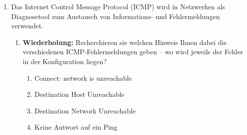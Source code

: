 \documentclass[paper=a4,fontsize=11pt]{scrartcl}%
\numberwithin{equation}{section}
\begin{document}
\begin{enumerate}
	\begin{enumerate}
	\item Recherchieren sie mit den vorangegangen Quellen, was ein Routing-Table/Routing-Tabelle ist \footnote{\url{https://docs.freebsd.org/doc/12.1-RELEASE/usr/local/share/doc/freebsd/de_DE.ISO8859-1/books/handbook/network-routing.html}}.
	\item Recherchieren sie den Unterschied zwischen Forwarding und Routing.
	\item Wie aktivieren sie unter \emph{freeBSD} das Forwarding? Analog: Wie wird  das Forwarding unter Linux (Arch-Linux) eingeschaltet?
	\item In welcher Konfigurationsdatei müssen sie einen Eintrag vornehmen, so das das Routing dauerhaft beim Systemstart aktiviert bleibt? Notieren sie sich beispielhaft (auszugsweise) wie dies aussehen kann.
	\end{enumerate}
	\item Das Internet Control Message Protocol (ICMP) wird in Netzwerken als Diagnosetool zum Austausch von Informations- und Fehlermeldungen verwendet. 
	\begin{enumerate}
		\item \textbf{Wiederholung:} Recherchieren sie welchen Hinweis Ihnen dabei die verschiedenen ICMP-Fehlermeldungen geben -- wo wird jeweils der Fehler in der Konfiguration liegen?
		\begin{enumerate}
			\item Connect: network is unreachable
			\item Destination Host Unreachable
			\item Destination Network Unreachable
			\item Keine Antwort auf ein Ping
		\end{enumerate}  
	\end{enumerate}
\end{enumerate}
\end{document}
